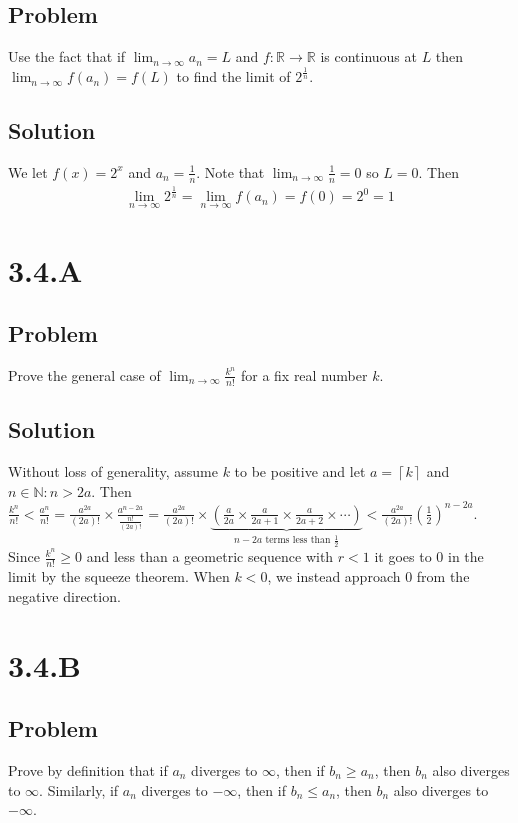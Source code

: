 \documentclass[12pt]{article}
\newcommand{\round}[1]{\left(       #1 \right)      }
\newcommand{\ceil} [1]{\left\lceil  #1 \right\rceil }
\newcommand{\R}    [0]{\mathbb{R}                   }
\newcommand{\N}    [0]{\mathbb{N}                   }
\begin{document}
\subsection*{Problem}
Use the fact that if $\lim_{n \to \infty} a_n = L$ and $f : \R \to \R$ is continuous at $L$ then $\lim_{n \to \infty} f(a_n) = f(L)$ to find the limit of $2^\frac{1}{n}$.

\subsection*{Solution}
We let $f(x) = 2^x$ and $a_n = \frac{1}{n}$. Note that $\lim_{n\to\infty} \frac{1}{n} = 0$ so $L = 0$. Then
\begin{align*}
    \lim_{n\to\infty} 2^\frac{1}{n} = \lim_{n\to\infty} f(a_n) = f(0) = 2^0 = 1
\end{align*}



\section*{3.4.A}

\subsection*{Problem}
Prove the general case of $\lim_{n \to \infty} \frac{k^n}{n!}$ for a fix real number $k$.

\subsection*{Solution}
Without loss of generality, assume $k$ to be positive and let $a = \ceil{k}$ and $n \in \N : n > 2a$. Then $\frac{k^n}{n!} < \frac{a^n}{n!} = \frac{a^{2a}}{(2a)!} \times \frac{a^{n-2a}}{\frac{n!}{(2a)!}} = \frac{a^{2a}}{(2a)!} \times \underbrace{\round{\frac{a}{2a} \times \frac{a}{2a+1} \times \frac{a}{2a+2} \times \cdots}}_{n-2a \text{ terms less than } \frac{1}{2}} < \frac{a^{2a}}{(2a)!} \round{\frac{1}{2}}^{n-2a}$. Since $\frac{k^n}{n!} \geq 0$ and less than a geometric sequence with $r < 1$ it goes to 0 in the limit by the squeeze theorem. When $k < 0$, we instead approach 0 from the negative direction.



\section*{3.4.B}

\subsection*{Problem}
Prove by definition that if $a_n$ diverges to $\infty$, then if $b_n \geq a_n$, then $b_n$ also diverges to $\infty$. Similarly, if $a_n$ diverges to $-\infty$, then if $b_n \leq a_n$, then $b_n$ also diverges to $-\infty$.
\end{document}
